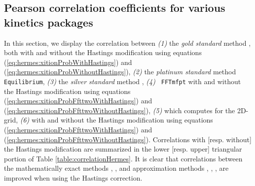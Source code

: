 \subsection{Pearson correlation coefficients for various kinetics packages}
\label{subsec:hermes:corr}

In this section, we display the correlation between {\em (1)} the {\em gold
standard} method \rnamfpt, both with and without the Hastings
modification using equations (\ref{eq:hermes:xitionProbWithHastings}) and
(\ref{eq:hermes:xitionProbWithoutHastings}), {\em (2)} the {\em platinum standard} method {\tt
Equilibrium}, {\em (3)} the {\em silver standard} method \kinfold, {\em (4)} {\tt
FFTmfpt} with and without the Hastings modification using equations
(\ref{eq:hermes:xitionProbFfttwoWithHastings}) and
(\ref{eq:hermes:xitionProbFfttwoWithoutHastings}), {\em (5)} \ffteq
which computes \eqt for the 2D-grid, {\em (6)} \rnatwofold
with and without the Hastings modification using equations
(\ref{eq:hermes:xitionProbFfttwoWithHastings}) and
(\ref{eq:hermes:xitionProbFfttwoWithoutHastings}). Correlations
with [resp. without] the Hastings modification are summarized in the
lower [resp. upper] triangular portion of
Table \ref{table:correlationHermes}. It is clear that correlations between
the mathematically exact methods \rnamfpt, \rnaeq, and
approximation methods \kinfold, \fftmfpt, \ffteq, \rnatwofold are
improved when using the Hastings correction.

